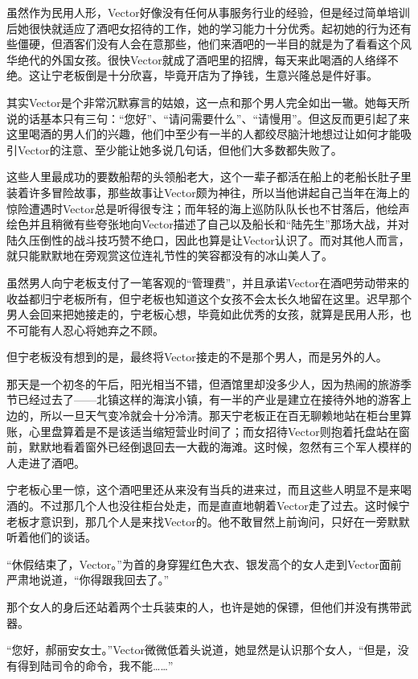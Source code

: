 虽然作为民用人形，Vector好像没有任何从事服务行业的经验，但是经过简单培训后她很快就适应了酒吧女招待的工作，她的学习能力十分优秀。起初她的行为还有些僵硬，但酒客们没有人会在意那些，他们来酒吧的一半目的就是为了看看这个风华绝代的外国女孩。很快Vector就成了酒吧里的招牌，每天来此喝酒的人络绎不绝。这让宁老板倒是十分欣喜，毕竟开店为了挣钱，生意兴隆总是件好事。

其实Vector是个非常沉默寡言的姑娘，这一点和那个男人完全如出一辙。她每天所说的话基本只有三句：“您好”、“请问需要什么”、“请慢用”。但这反而更引起了来这里喝酒的男人们的兴趣，他们中至少有一半的人都绞尽脑汁地想过让如何才能吸引Vector的注意、至少能让她多说几句话，但他们大多数都失败了。

这些人里最成功的要数船帮的头领船老大，这个一辈子都活在船上的老船长肚子里装着许多冒险故事，那些故事让Vector颇为神往，所以当他讲起自己当年在海上的惊险遭遇时Vector总是听得很专注；而年轻的海上巡防队队长也不甘落后，他绘声绘色并且稍微有些夸张地向Vector描述了自己以及船长和“陆先生”那场大战，并对陆久压倒性的战斗技巧赞不绝口，因此也算是让Vector认识了。而对其他人而言，就只能默默地在旁观赏这位连礼节性的笑容都没有的冰山美人了。

虽然男人向宁老板支付了一笔客观的“管理费”，并且承诺Vector在酒吧劳动带来的收益都归宁老板所有，但宁老板也知道这个女孩不会太长久地留在这里。迟早那个男人会回来把她接走的，宁老板心想，毕竟如此优秀的女孩，就算是民用人形，也不可能有人忍心将她弃之不顾。

但宁老板没有想到的是，最终将Vector接走的不是那个男人，而是另外的人。

那天是一个初冬的午后，阳光相当不错，但酒馆里却没多少人，因为热闹的旅游季节已经过去了——北镇这样的海滨小镇，有一半的产业是建立在接待外地的游客上边的，所以一旦天气变冷就会十分冷清。那天宁老板正在百无聊赖地站在柜台里算账，心里盘算着是不是该适当缩短营业时间了；而女招待Vector则抱着托盘站在窗前，默默地看着窗外已经倒退回去一大截的海滩。这时候，忽然有三个军人模样的人走进了酒吧。

宁老板心里一惊，这个酒吧里还从来没有当兵的进来过，而且这些人明显不是来喝酒的。不过那几个人也没往柜台处走，而是直直地朝着Vector走了过去。这时候宁老板才意识到，那几个人是来找Vector的。他不敢冒然上前询问，只好在一旁默默听着他们的谈话。

“休假结束了，Vector。”为首的身穿猩红色大衣、银发高个的女人走到Vector面前严肃地说道，“你得跟我回去了。”

那个女人的身后还站着两个士兵装束的人，也许是她的保镖，但他们并没有携带武器。

“您好，郝丽安女士。”Vector微微低着头说道，她显然是认识那个女人，“但是，没有得到陆司令的命令，我不能……”


